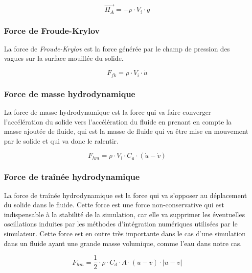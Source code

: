 				\begin{equation}
					\overrightarrow{\Pi_A} = - \rho \cdot V_i \cdot g
				\end{equation}

			\subsubsection{Force de Froude-Krylov}

				La force de \textit{Froude-Krylov} est la force générée par le champ de pression des vagues sur la surface mouillée du solide.

				\begin{equation}
					F_{fk} = \rho \cdot V_i \cdot \dot{u}
				\end{equation}

			\subsubsection{Force de masse hydrodynamique}

				La force de masse hydrodynamique est la force qui va faire converger l'accélération du solide vers l'accélération du fluide en prenant en compte la masse ajoutée de fluide, qui est la masse de fluide qui va être mise en mouvement par le solide et qui va donc le ralentir.

				\begin{equation}
					F_{hm} = \rho \cdot V_i \cdot C_a \cdot (\dot{u} - \dot{v})
				\end{equation}

			\subsubsection{Force de traînée hydrodynamique}

				La force de traînée hydrodynamique est la force qui va s'opposer au déplacement du solide dans le fluide. Cette force est une force non-conservative qui est indispensable à la stabilité de la simulation, car elle va supprimer les éventuelles oscillations induites par les méthodes d'intégration numériques utilisées par le simulateur. Cette force est en outre très importante dans le cas d'une simulation dans un fluide ayant une grande masse volumique, comme l'eau dans notre cas.

				\begin{equation}
					F_{hm} = \frac{1}{2} \cdot \rho \cdot C_d \cdot A \cdot (u - v) \cdot |u - v|
				\end{equation}

